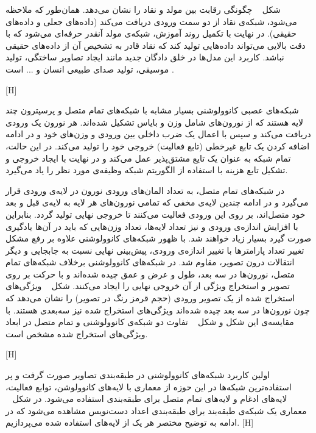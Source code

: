 شکل ~ چگونگی رقابت بین مولد و نقاد را نشان می‌دهد. همان‌طور که ملاحظه می‌شود، شبکه‌ی نقاد از دو سمت ورودی دریافت می‌کند (داده‌های جعلی و داده‌های حقیقی). در نهایت با تکمیل روند آموزش، شبکه‌ی مولد آنقدر حرفه‌ای می‌شود که با دقت بالایی می‌تواند داده‌هایی تولید کند که نقاد قادر به تشخیص آن از داده‌های حقیقی نباشد. کاربرد این مدل‌ها در خلق دادگان جدید مانند ایجاد تصاویر ساختگی، تولید موسیقی، تولید صدای طبیعی انسان و ... است .

[H]
 
شبکه‌های عصبی کانوولوشنی بسیار مشابه با شبکه‌های تمام متصل و پرسپترون چند لایه هستند که از نورون‌های شامل وزن و بایاس تشکیل شده‌اند. هر نورون‌ یک ورودی دریافت می‌کند و سپس با اعمال یک ضرب داخلی بین ورودی و وزن‌های خود و در ادامه اضافه کردن یک تابع غیرخطی (تابع فعالیت) خروجی خود را تولید می‌کند. در این حالت، تمام شبکه به عنوان یک تایع مشتق‌پذیر عمل می‌کند و در نهایت با ایجاد خروجی و تشکیل تابع هزینه با استفاده از الگوریتم  شبکه وظیفه‌ی مورد نظر را یاد می‌گیرد.

در شبکه‌های تمام متصل، به تعداد المان‌های ورودی نورون در لایه‌ی ورودی قرار می‌گیرد و در ادامه چندین لایه‌ی مخفی که تمامی نورون‌های هر لایه به لایه‌ی قبل و بعد خود متصل‌اند، بر روی این ورودی فعالیت می‌کنند تا خروجی نهایی تولید گردد. بنابراین با افزایش اندازه‌ی ورودی و نیز تعداد لایه‌ها، تعداد وزن‌هایی که باید در آن‌ها یادگیری صورت گیرد بسیار زیاد خواهند شد. با ظهور شبکه‌های کانوولوشنی علاوه بر رفع مشکل تغییر تعداد پارامترها با تغییر اندازه‌ی ورودی، پیش‌بینی نهایی نسبت به جابجایی و دیگر انتقالات درون تصویر، مقاوم شد. در شبکه‌های کانوولوشنی برخلاف شبکه‌های تمام متصل، نورون‌ها در سه بعد، طول و عرض و عمق چیده شده‌اند و با حرکت بر روی تصویر و استخراج ویژگی از آن خروجی نهایی را ایجاد می‌کنند. شکل ~ ویژگی‌های استخراج شده از یک تصویر ورودی (حجم قرمز رنگ در تصویر) را نشان می‌دهد که چون نورون‌ها در سه بعد چیده شده‌اند ویژگی‌های استخراج شده نیز سه‌بعدی هستند. با مقایسه‌‌ی این شکل و شکل ~  تفاوت دو شبکه‌ی کانوولوشنی و تمام متصل در ابعاد ویژگی‌های استخراج شده مشخص است.

[H]

اولین کاربرد شبکه‌های کانوولوشنی در طبقه‌بندی تصاویر صورت گرفت و پر استفاده‌ترین شبکه‌ها در این حوزه از معماری با لایه‌های کانوولوشن، توابع فعالیت، لایه‌های ادغام و لایه‌های تمام متصل برای طبقه‌بندی استفاده می‌شود. در شکل ~ معماری یک شبکه‌ی طبقه‌بند برای طبقه‌بندی اعداد دست‌نویس مشاهده می‌شود که در ادامه به توضیح مختصر هر یک از لایه‌های استفاده شده می‌پردازیم.
[H]

